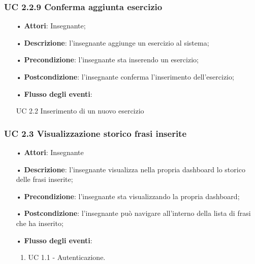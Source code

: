 \subsubsection{UC 2.2.9 Conferma aggiunta esercizio}
\begin{itemize}
	\item[•] \textbf{Attori}: Insegnante;
	\item[•] \textbf{Descrizione}: l'insegnante aggiunge un esercizio al sistema;
	\item[•] \textbf{Precondizione}: l’insegnante sta inserendo un esercizio;
	\item[•] \textbf{Postcondizione}: l'insegnante conferma l'inserimento dell'esercizio;
	\item[•] \textbf{Flusso degli eventi}: 
	\begin{enumerate}
	UC 2.2 Inserimento di un nuovo esercizio
	\end{enumerate}
\end{itemize}

\subsubsection{UC 2.3 Visualizzazione storico frasi inserite}
\begin{itemize}
	\item[•] \textbf{Attori}: Insegnante	   
	\item[•] \textbf{Descrizione}: l’insegnante visualizza nella propria dashboard lo storico delle frasi inserite; 
	\item[•] \textbf{Precondizione}: l'insegnante sta visualizzando la propria dashboard;
	\item[•] \textbf{Postcondizione}: l’insegnante può navigare all’interno della lista di frasi che ha inserito;
	\item[•] \textbf{Flusso degli eventi}:
	\begin{enumerate}
		\item UC 1.1 - Autenticazione.
	\end{enumerate}
\end{itemize}


